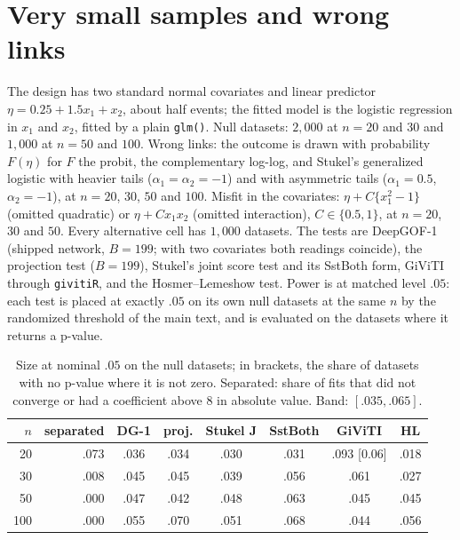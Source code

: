 \section{Very small samples and wrong links}\label{sec:smallnlink}

The design has two standard normal covariates and linear predictor $\eta=0.25+1.5x_{1}+x_{2}$, about half
events; the fitted model is the logistic regression in $x_{1}$ and $x_{2}$, fitted by a plain \texttt{glm()}.
Null datasets: $2{,}000$ at $n=20$ and $30$ and $1{,}000$ at $n=50$ and $100$. Wrong links: the outcome is
drawn with probability $F(\eta)$ for $F$ the probit, the complementary log-log, and Stukel's generalized
logistic with heavier tails ($\alpha_{1}=\alpha_{2}=-1$) and with asymmetric tails ($\alpha_{1}=0.5$,
$\alpha_{2}=-1$), at $n=20$, $30$, $50$ and $100$. Misfit in the covariates: $\eta+C\{x_{1}^{2}-1\}$ (omitted
quadratic) or $\eta+Cx_{1}x_{2}$ (omitted interaction), $C\in\{0.5,1\}$, at $n=20$, $30$ and $50$. Every
alternative cell has $1{,}000$ datasets. The tests are DeepGOF-1 (shipped network, $B=199$; with two
covariates both readings coincide), the projection test ($B=199$), Stukel's joint score test and its SstBoth
form, GiViTI through \texttt{givitiR}, and the Hosmer--Lemeshow test. Power is at matched level $.05$: each
test is placed at exactly $.05$ on its own null datasets at the same $n$ by the randomized threshold of the
main text, and is evaluated on the datasets where it returns a p-value.

\begin{table}[h]
\centering
\caption{Size at nominal $.05$ on the null datasets; in brackets, the share of datasets with no p-value
where it is not zero. Separated: share of fits that did not converge or had a coefficient above $8$ in
absolute value. Band: $[.035,.065]$.}
\label{tab:smalln_size}
\small
\begin{tabular}{@{}rrcccccc@{}}
\toprule
$n$ & separated & DG-1 & proj. & Stukel J & SstBoth & GiViTI & HL \\
\midrule
20 & .073 & .036 & .034 & .030 & .031 & .093 [0.06] & .018 \\
30 & .008 & .045 & .045 & .039 & .056 & .061 & .027 \\
50 & .000 & .047 & .042 & .048 & .063 & .045 & .045 \\
100 & .000 & .055 & .070 & .051 & .068 & .044 & .056 \\
\bottomrule
\end{tabular}
\end{table}

